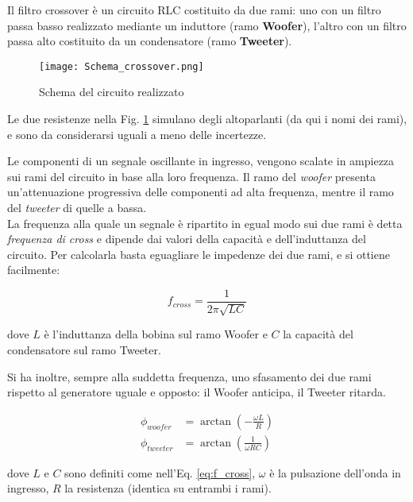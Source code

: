 \documentclass[../Relazione_circuiti]{subfiles}
\begin{document}
Il filtro crossover è un circuito RLC costituito da due rami: uno con un filtro passa basso realizzato mediante un
induttore (ramo \textbf{Woofer}), l'altro con un filtro passa alto costituito da un condensatore (ramo
\textbf{Tweeter}).

\begin{figure}[H]
  \centering
  \texttt{[image: Schema\_crossover.png]}

  \caption{Schema del circuito realizzato}
  \label{fig:schema_circuito}

\end{figure}

Le due resistenze nella Fig. \ref{fig:schema_circuito} simulano degli altoparlanti (da qui i nomi dei rami), e sono da
considerarsi uguali a meno delle incertezze.

Le componenti di un segnale oscillante in ingresso, vengono scalate in ampiezza sui rami del circuito in base alla loro
frequenza. Il ramo del \textit{woofer} presenta un'attenuazione progressiva delle componenti ad alta frequenza, mentre il ramo
del \textit{tweeter} di quelle a bassa.\\
La frequenza alla quale un segnale è ripartito in egual modo sui due rami è detta \textit{frequenza di cross} e dipende
dai valori della capacità e dell'induttanza del circuito.
Per calcolarla basta eguagliare le impedenze dei due rami, e si ottiene facilmente:

\begin{equation}
  \label{eq:f_cross}
  f_{cross} = \frac{1}{2 \pi \sqrt{LC} }
\end{equation}

dove $L$ è l'induttanza della bobina sul ramo Woofer e $C$ la capacità del condensatore sul ramo Tweeter.

Si ha inoltre, sempre alla suddetta frequenza, uno sfasamento dei due rami rispetto al generatore uguale e opposto: il
Woofer anticipa, il Tweeter ritarda.

\begin{align}
  \phi_{woofer} &= \arctan(-\frac{\omega L}{R}) \label{eq:p_woofer} \\
  \phi_{tweeter} &= \arctan(\frac{1}{\omega RC}) \label{eq:p_tweeter}
\end{align}

dove $L$ e $C$ sono definiti come nell'Eq. \eqref{eq:f_cross}, $\omega$ è la pulsazione dell'onda in ingresso, $R$ la resistenza
(identica su entrambi i rami).
\end{document}
